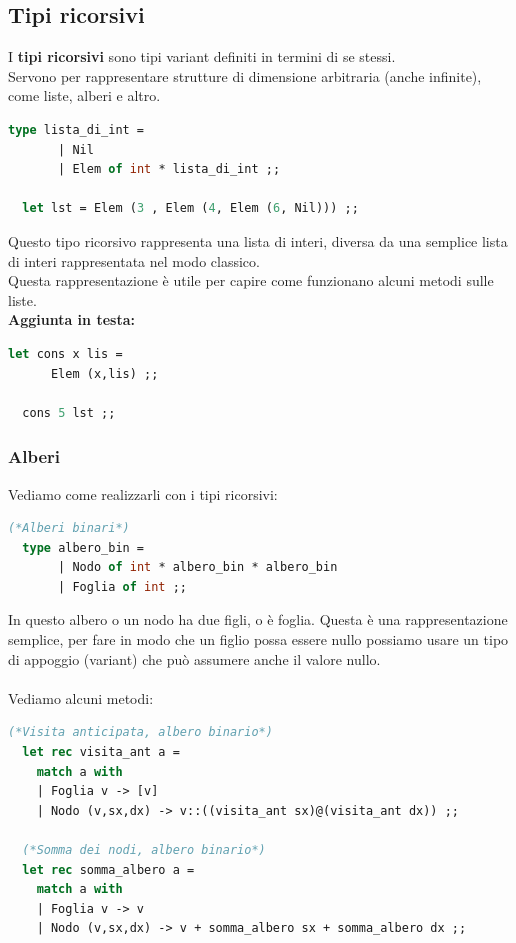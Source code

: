\documentclass[12pt,a4paper]{article}
\begin{document}
\subsection{Tipi ricorsivi}
I \textbf{tipi ricorsivi} sono tipi variant definiti in termini di se stessi.\\
Servono per rappresentare strutture di dimensione arbitraria (anche infinite), come liste, alberi e altro.
\begin{lstlisting}[language=OCaml]
  type lista_di_int = 
       | Nil
       | Elem of int * lista_di_int ;;

  let lst = Elem (3 , Elem (4, Elem (6, Nil))) ;;
\end{lstlisting}
Questo tipo ricorsivo rappresenta una lista di interi, diversa da una semplice lista di interi rappresentata nel modo classico.\\
Questa rappresentazione è utile per capire come funzionano alcuni metodi sulle liste.\\
\textbf{Aggiunta in testa:}
\begin{lstlisting}[language=OCaml]
  let cons x lis = 
      Elem (x,lis) ;;

  cons 5 lst ;;
\end{lstlisting}
\subsubsection{Alberi}
Vediamo come realizzarli con i tipi ricorsivi:
\begin{lstlisting}[language=OCaml]
  (*Alberi binari*)
  type albero_bin = 
       | Nodo of int * albero_bin * albero_bin
       | Foglia of int ;;
\end{lstlisting}
In questo albero o un nodo ha due figli, o è foglia. Questa è una rappresentazione semplice, per fare in modo che un figlio possa essere nullo possiamo usare un tipo di appoggio (variant) che può assumere anche il valore nullo.\\\\
Vediamo alcuni metodi:
\begin{lstlisting}[language=OCaml]
  (*Visita anticipata, albero binario*)
  let rec visita_ant a =
    match a with
    | Foglia v -> [v]
    | Nodo (v,sx,dx) -> v::((visita_ant sx)@(visita_ant dx)) ;;
    
  (*Somma dei nodi, albero binario*)
  let rec somma_albero a =
    match a with
    | Foglia v -> v
    | Nodo (v,sx,dx) -> v + somma_albero sx + somma_albero dx ;;
\end{lstlisting}
\end{document}
